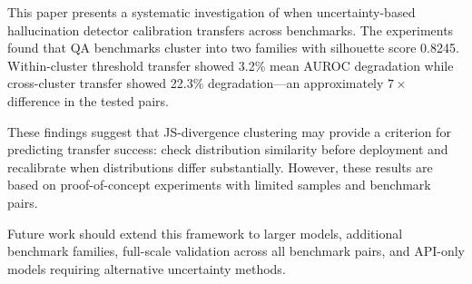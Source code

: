 
This paper presents a systematic investigation of when uncertainty-based hallucination detector calibration transfers across benchmarks. The experiments found that QA benchmarks cluster into two families with silhouette score 0.8245. Within-cluster threshold transfer showed 3.2\% mean AUROC degradation while cross-cluster transfer showed 22.3\% degradation---an approximately $7\times$ difference in the tested pairs.

These findings suggest that JS-divergence clustering may provide a criterion for predicting transfer success: check distribution similarity before deployment and recalibrate when distributions differ substantially. However, these results are based on proof-of-concept experiments with limited samples and benchmark pairs.

Future work should extend this framework to larger models, additional benchmark families, full-scale validation across all benchmark pairs, and API-only models requiring alternative uncertainty methods.

